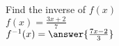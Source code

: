 \documentclass{ximera}
\author{David Kish}
\begin{document}
\begin{exercise}
Find the inverse of $f(x)$\\
$f(x)= \frac{3x+2}{7}$\\
$f^{-1}(x)=\answer{\frac{7x-2}{3}}$\\
\end{exercise}
\end{document}
